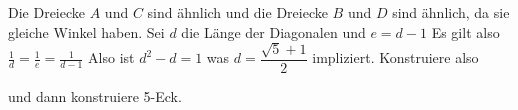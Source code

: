 \begin{Bsp}
\begin{center}
\begin{tikzpicture}
    
 \end{tikzpicture}\end{center}
 Die Dreiecke \(A\) und \(C\) sind ähnlich und die Dreiecke \(B\) und \(D\) sind ähnlich, da sie gleiche Winkel haben.
 Sei \(d\) die Länge der Diagonalen und \(e=d-1\)
 Es gilt also \(\frac 1 d=\frac{1}{e}=\frac{1}{d-1}\)
 Also ist \(d^2-d=1\) was \(d=\dfrac{\sqrt 5+1}{2}\) impliziert.
 Konstruiere also
 \begin{center}\end{center}
 und dann konstruiere 5-Eck.
\end{Bsp}
